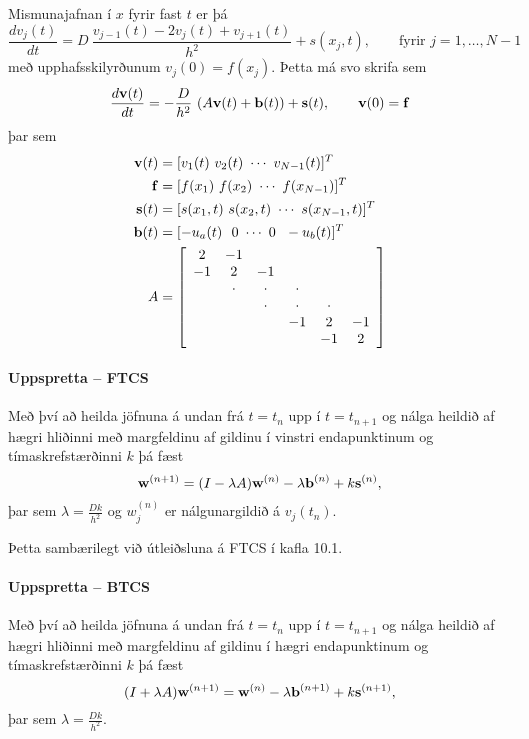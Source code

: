 \documentclass[icelandic,a4paper,12pt]{article}
\begin{document}
Mismunajafnan í $x$ fyrir fast $t$ er þá 
 $$ 
 \frac{d v_j(t)}{d t} =  D\  \frac{v_{j-1}(t) -2 v_j(t) + v_{j+1}(t)}{h^2} + s(x_j,t), \qquad
 \text{fyrir } j=1,\ldots,N-1
 $$ \pause
 með upphafsskilyrðunum $v_j(0) = f(x_j)$. \pause
 Þetta má svo skrifa sem
 $$ 
 \frac{d \mbox{${\bf v}$}(t)}{d t} =  -\frac{D}{h^2}\  (A\mbox{${\bf v}$}(t) + \mbox{${\bf b}$}(t)) + \mbox{${\bf s}$}(t), \qquad \mbox{${\bf v}$}(0)=\mbox{${\bf f}$}
 $$
 þar sem 
 {\small \begin{align*}
  \mbox{${\bf v}$}(t) &= [v_1(t) \ v_2(t) \ \cdots \ v_{N-1}(t) ]^T\\
  \mbox{${\bf f}$} &= [ f(x_1) \ f(x_2) \ \cdots \ f(x_{N-1}) ]^T\\
  \mbox{${\bf s}$}(t) &= [ s(x_1,t) \ s(x_2,t) \ \cdots \ s(x_{N-1},t) ]^T\\
  \mbox{${\bf b}$}(t) &= [ -u_a(t) \ \ 0 \ \cdots \ 0 \ \ -u_b(t) ]^T \\
  A &=  \left[\begin{array}{cccccc}
2 & -1 &   &   &   &  \\
-1 & 2 & -1 &   &   &  \\
  & \cdot & \cdot & \cdot &   &  \\
  &   & \cdot & \cdot & \cdot &  \\
  &   &  & -1 & 2 & -1\\
  &   &   &   & -1 & 2
      \end{array}\right] 
 \end{align*}}
  

  \paragraph{Uppspretta -- FTCS}
   Með því að heilda jöfnuna á undan frá $t=t_n$ upp í $t=t_{n+1}$
   og nálga heildið af hægri hliðinni með margfeldinu af gildinu í vinstri
   endapunktinum og tímaskrefstærðinni $k$ þá fæst
   $$
    \mbox{${\bf w}$}^{(n+1)} = (I-\lambda A)\mbox{${\bf w}$}^{(n)} - \lambda \mbox{${\bf b}$}^{(n)} + k\mbox{${\bf s}$}^{(n)},
    $$
þar sem $\lambda = \frac{Dk}{h^2}$ og $w_j^{(n)}$ er nálgunargildið á $v_j(t_n)$. \pause
    
    \smallskip
    Þetta sambærilegt við útleiðsluna á FTCS í kafla 10.1.
  

  \paragraph{Uppspretta -- BTCS}
   Með því að heilda jöfnuna á undan frá $t=t_n$ upp í $t=t_{n+1}$
   og nálga heildið af hægri hliðinni með margfeldinu af gildinu í hægri
   endapunktinum og tímaskrefstærðinni $k$ þá fæst
   $$
    (I+\lambda A)\mbox{${\bf w}$}^{(n+1)} = \mbox{${\bf w}$}^{(n)} - \lambda \mbox{${\bf b}$}^{(n+1)} + k\mbox{${\bf s}$}^{(n+1)},
    $$ 
þar sem $\lambda = \frac{Dk}{h^2}$. \pause
    
\end{document}
